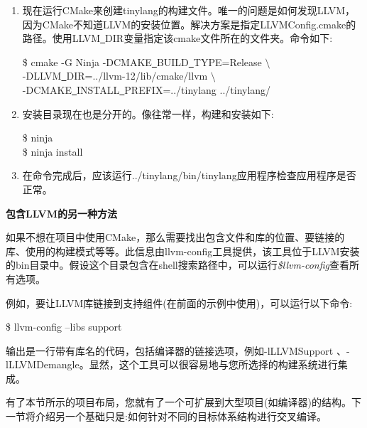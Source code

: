 \begin{enumerate}
	\item 现在运行CMake来创建tinylang的构建文件。唯一的问题是如何发现LLVM，因为CMake不知道LLVM的安装位置。解决方案是指定LLVMConfig.cmake的路径。使用LLVM\underline{~}DIR变量指定该cmake文件所在的文件夹。命令如下:
	\begin{tcolorbox}[colback=white,colframe=black]
		\$ cmake -G Ninja -DCMAKE\underline{~}BUILD\underline{~}TYPE=Release $\setminus$ \\
		-DLLVM\underline{~}DIR=../llvm-12/lib/cmake/llvm $\setminus$ \\
		-DCMAKE\underline{~}INSTALL\underline{~}PREFIX=../tinylang ../tinylang/
	\end{tcolorbox}

	\item 安装目录现在也是分开的。像往常一样，构建和安装如下:
	\begin{tcolorbox}[colback=white,colframe=black]
		\$ ninja \\
		\$ ninja install
	\end{tcolorbox}
	\item 在命令完成后，应该运行../tinylang/bin/tinylang应用程序检查应用程序是否正常。
\end{enumerate}


\hspace*{\fill} \par %
\textbf{包含LLVM的另一种方法}

如果不想在项目中使用CMake，那么需要找出包含文件和库的位置、要链接的库、使用的构建模式等等。此信息由llvm-config工具提供，该工具位于LLVM安装的bin目录中。假设这个目录包含在shell搜索路径中，可以运行\textit{\$llvm-config}查看所有选项。\par

例如，要让LLVM库链接到支持组件(在前面的示例中使用)，可以运行以下命令:\par

\begin{tcolorbox}[colback=white,colframe=black]
	\$ llvm-config –libs support
\end{tcolorbox}

输出是一行带有库名的代码，包括编译器的链接选项，例如-lLLVMSupport 、-lLLVMDemangle。显然，这个工具可以很容易地与您所选择的构建系统进行集成。\par

有了本节所示的项目布局，您就有了一个可扩展到大型项目(如编译器)的结构。下一节将介绍另一个基础只是:如何针对不同的目标体系结构进行交叉编译。\par












